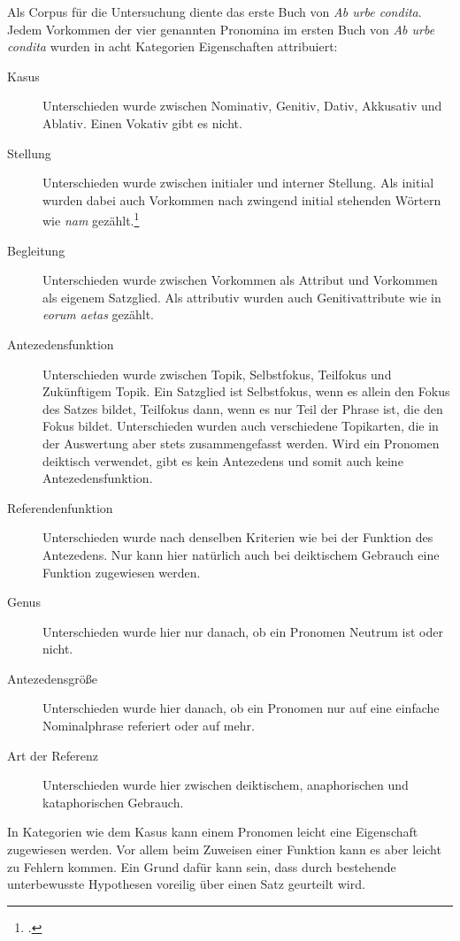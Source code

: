 \documentclass[12pt]{article}
\newcommand{\lat}[1]{\textit{#1}} %
\newcommand{\cntrl}[1]{#1} %
\begin{document}
Als Corpus für die Untersuchung diente das erste Buch von \lat{Ab urbe condita}.
Jedem Vorkommen der vier genannten Pronomina im ersten Buch von \lat{Ab urbe condita} wurden in acht \cntrl{Kategorien} Eigenschaften attribuiert:
\begin{description} %

  \item[Kasus] Unterschieden wurde zwischen Nominativ, Genitiv, Dativ, Akkusativ und Ablativ. Einen Vokativ gibt es nicht.
  \item[Stellung] Unterschieden wurde zwischen initialer und interner Stellung. Als initial wurden dabei auch Vorkommen nach zwingend initial stehenden Wörtern wie \lat{nam} gezählt.\footcite[Siehe dazu][S.\,13--15]{spevak}
  \item[\cntrl{Begleitung}] Unterschieden wurde zwischen Vorkommen als Attribut und Vorkommen als eigenem Satzglied. Als attributiv wurden auch Genitivattribute wie in \lat{eorum aetas} gezählt.
  \item[Antezedensfunktion] Unterschieden wurde zwischen Topik, Selbstfokus, Teilfokus und Zukünftigem Topik. Ein Satzglied ist Selbstfokus, wenn es allein den Fokus des Satzes \cntrl{bildet}, Teilfokus dann, wenn es nur Teil der Phrase ist, die den Fokus \cntrl{bildet}. Unterschieden wurden auch verschiedene Topikarten, die in der Auswertung aber stets zusammengefasst werden.
	Wird ein Pronomen deiktisch verwendet, gibt es kein Antezedens und somit auch keine Antezedensfunktion.
  \item[Referendenfunktion] Unterschieden wurde nach denselben Kriterien wie bei der Funktion des Antezedens. Nur kann hier natürlich auch bei deiktischem Gebrauch eine Funktion zugewiesen werden.
  \item[Genus] Unterschieden wurde hier nur danach, ob ein Pronomen Neutrum ist oder nicht.
  \item[Antezedensgröße] Unterschieden wurde hier danach, ob ein Pronomen nur auf eine einfache Nominalphrase referiert oder auf mehr.
  \item[Art der Referenz] Unterschieden wurde hier zwischen deiktischem, anaphorischen und kataphorischen Gebrauch.

\end{description}

\noindent In Kategorien wie dem Kasus kann einem Pronomen leicht eine Eigenschaft zugewiesen werden. Vor allem beim Zuweisen einer Funktion kann es aber leicht zu Fehlern kommen. Ein Grund dafür kann sein, dass durch bestehende unterbewusste Hypothesen voreilig über einen Satz geurteilt wird.
\end{document}
